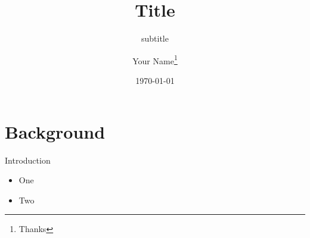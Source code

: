\documentclass{beamer}
\author{Your Name\thanks{Thanks}}
\institute{Department}
\date{\today}
\title{Title}
\subtitle{subtitle}
\begin{document}
	
	\maketitle
	
	\section{Background}
	
	\begin{frame}{Introduction}
		
		\begin{itemize}
			\item One
			\item Two
			
		\end{itemize}
		
	\end{frame}
	
	
\end{document}
